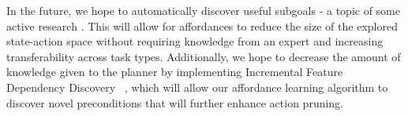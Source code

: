 \documentclass[conference]{IEEEtran}
\begin{document}
In the future, we hope to automatically discover useful subgoals - a topic of some active research \cite{Mcgovern01automaticdiscovery,Simsek:2005:IUS:1102351.1102454}. This will allow for affordances to reduce the size of the explored state-action space without requiring knowledge from an expert and increasing transferability across task types. Additionally, we hope to decrease the amount of knowledge given to the planner by implementing Incremental Feature Dependency Discovery ~\cite{ICML2011Geramifard_473}, which will allow our affordance learning algorithm to discover novel preconditions that will further enhance action pruning.


{\small


}
\end{document}
